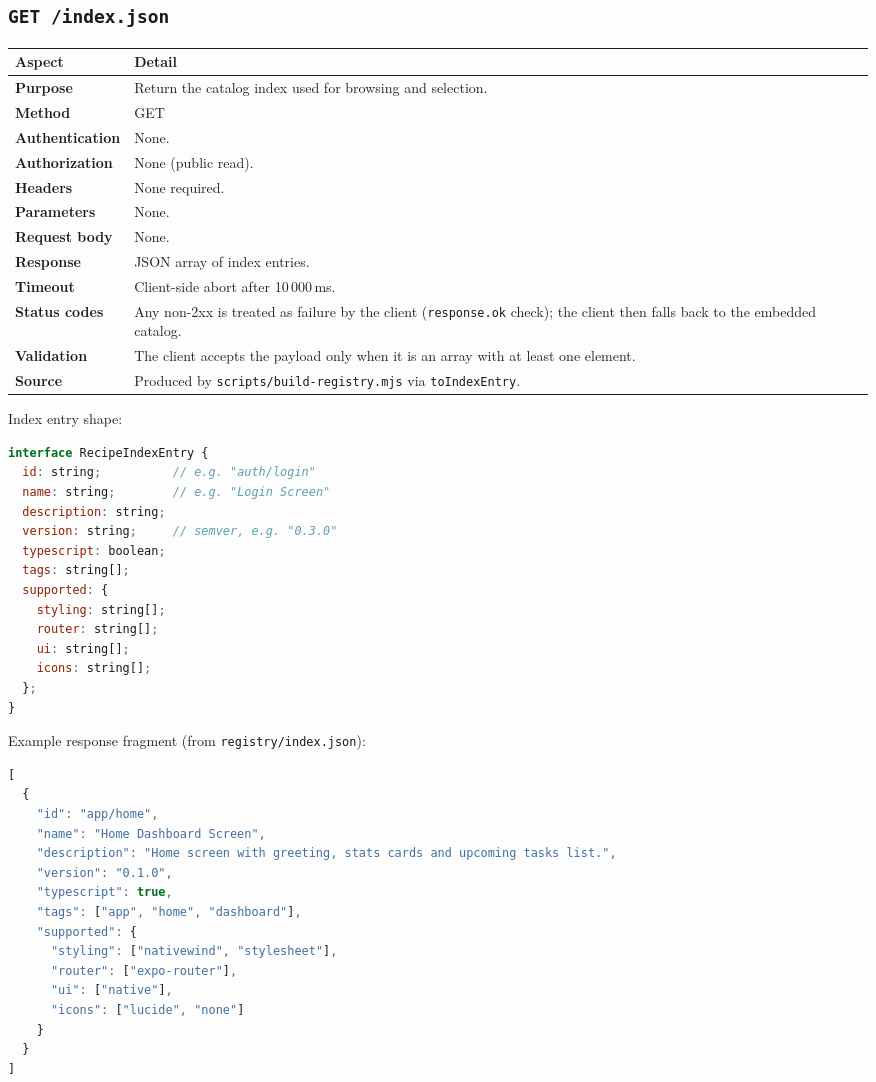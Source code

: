 \subsection*{\texttt{GET /index.json}}

\begin{longtable}{p{3.4cm}p{10.8cm}}
\toprule
\textbf{Aspect} & \textbf{Detail} \\
\midrule
\textbf{Purpose} & Return the catalog index used for browsing and selection. \\
\textbf{Method} & GET \\
\textbf{Authentication} & None. \\
\textbf{Authorization} & None (public read). \\
\textbf{Headers} & None required. \\
\textbf{Parameters} & None. \\
\textbf{Request body} & None. \\
\textbf{Response} & JSON array of index entries. \\
\textbf{Timeout} & Client-side abort after 10\,000\,ms. \\
\textbf{Status codes} & Any non-2xx is treated as failure by the client
(\texttt{response.ok} check); the client then falls back to the embedded catalog. \\
\textbf{Validation} & The client accepts the payload only when it is an array with
at least one element. \\
\textbf{Source} & Produced by \texttt{scripts/build-registry.mjs} via
\texttt{toIndexEntry}. \\
\bottomrule
\end{longtable}

Index entry shape:

\begin{lstlisting}[language=JavaScript]
interface RecipeIndexEntry {
  id: string;          // e.g. "auth/login"
  name: string;        // e.g. "Login Screen"
  description: string;
  version: string;     // semver, e.g. "0.3.0"
  typescript: boolean;
  tags: string[];
  supported: {
    styling: string[];
    router: string[];
    ui: string[];
    icons: string[];
  };
}
\end{lstlisting}

Example response fragment (from \texttt{registry/index.json}):

\begin{lstlisting}[language=JavaScript]
[
  {
    "id": "app/home",
    "name": "Home Dashboard Screen",
    "description": "Home screen with greeting, stats cards and upcoming tasks list.",
    "version": "0.1.0",
    "typescript": true,
    "tags": ["app", "home", "dashboard"],
    "supported": {
      "styling": ["nativewind", "stylesheet"],
      "router": ["expo-router"],
      "ui": ["native"],
      "icons": ["lucide", "none"]
    }
  }
]
\end{lstlisting}

